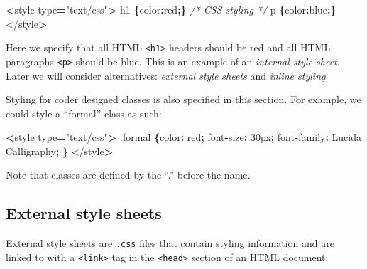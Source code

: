 \documentclass[openany]{book}
\newenvironment{Shaded}{\begin{snugshade}}{\end{snugshade}}
\newcommand{\AttributeTok}[1]{\textcolor[rgb]{0.77,0.63,0.00}{#1}}
\newcommand{\CommentTok}[1]{\textcolor[rgb]{0.56,0.35,0.01}{\textit{#1}}}
\newcommand{\DataTypeTok}[1]{\textcolor[rgb]{0.13,0.29,0.53}{#1}}
\newcommand{\NormalTok}[1]{#1}
\newcommand{\OperatorTok}[1]{\textcolor[rgb]{0.81,0.36,0.00}{\textbf{#1}}}
\newcommand{\StringTok}[1]{\textcolor[rgb]{0.31,0.60,0.02}{#1}}
\begin{document}
\begin{Shaded}
\begin{Highlighting}[]
\OperatorTok{<}\NormalTok{style type}\OperatorTok{=}\StringTok{"text/css"}\OperatorTok{>}
\NormalTok{    h1 }\OperatorTok{\{}\DataTypeTok{color}\OperatorTok{:}\NormalTok{red}\OperatorTok{;\}}     \CommentTok{/* CSS styling */}
\NormalTok{    p }\OperatorTok{\{}\DataTypeTok{color}\OperatorTok{:}\NormalTok{blue}\OperatorTok{;\}}
\NormalTok{</style}\OperatorTok{>}
\end{Highlighting}
\end{Shaded}

Here we specify that all HTML \texttt{\textless{}h1\textgreater{}} headers should be red and all HTML paragraphs \texttt{\textless{}p\textgreater{}} should be blue. This is an example of an \emph{internal style sheet}. Later we will consider alternatives: \emph{external style sheets} and \emph{inline styling}.

Styling for coder designed classes is also specified in this section. For example, we could style a ``formal'' class as such:

\begin{Shaded}
\begin{Highlighting}[]
\OperatorTok{<}\NormalTok{style type}\OperatorTok{=}\StringTok{"text/css"}\OperatorTok{>}
\NormalTok{    .}\AttributeTok{formal} \OperatorTok{\{}\DataTypeTok{color}\OperatorTok{:}\NormalTok{ red}\OperatorTok{;}        
\NormalTok{        font}\OperatorTok{-}\DataTypeTok{size}\OperatorTok{:}\NormalTok{ 30px}\OperatorTok{;}
\NormalTok{        font}\OperatorTok{-}\DataTypeTok{family}\OperatorTok{:}\NormalTok{ Lucida Calligraphy}\OperatorTok{;}
        \OperatorTok{\}}   
\NormalTok{</style}\OperatorTok{>}
\end{Highlighting}
\end{Shaded}

Note that classes are defined by the ``.'' before the name.

\hypertarget{external-style-sheets}{%
\subsection{External style sheets}\label{external-style-sheets}}

External style sheets are \texttt{.css} files that contain styling information and are linked to with a \texttt{\textless{}link\textgreater{}} tag in the \texttt{\textless{}head\textgreater{}} section of an HTML document:
\end{document}
